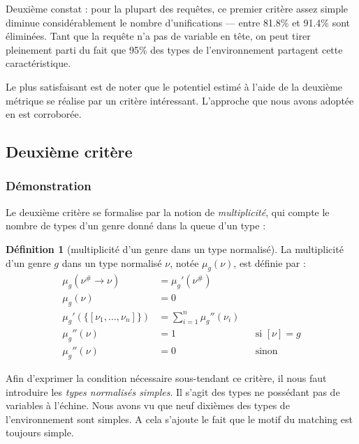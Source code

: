 \documentclass[a4paper]{report}
\theoremstyle{definition}
\newtheorem{definition}[theoreme]{Définition}
\newcommand{\mset}[1]{\{\![#1]\!\}}
\begin{document}
Deuxième constat : pour la plupart des requêtes, ce premier critère assez simple diminue considérablement le nombre d'unifications — entre 81.8\% et 91.4\% sont éliminées. Tant que la requête n'a pas de variable en tête, on peut tirer pleinement parti du fait que 95\% des types de l'environnement partagent cette caractéristique.

Le plus satisfaisant est de noter que le potentiel estimé à l'aide de la deuxième métrique se réalise par un critère intéressant. L'approche que nous avons adoptée en est corroborée.


\subsection{Deuxième critère}

\subsubsection{Démonstration}

Le deuxième critère se formalise par la notion de \emph{multiplicité}, qui compte le nombre de types d'un genre donné dans la queue d'un type :

\begin{definition}[multiplicité d'un genre dans un type normalisé]
  La multiplicité d'un genre $g$ dans un type normalisé $\nu$, notée $\mu_g (\nu)$, est définie par :
  \begin{align*}
      \mu_g (\nu^\# \rightarrow \nu) &=
      \mu_g' (\nu^\#)
    \\
      \mu_g (\nu) &=
      0
    \\
      \mu_g' (\mset{\nu_1, \dots, \nu_n}) &=
      \sum_{i=1}^n \mu_g'' (\nu_i)
    \\
      \mu_g'' (\nu) &=
      1 &&
      \text{si } [\nu] = g
    \\
      \mu_g'' (\nu) &=
      0 &&
      \text{sinon}
  \end{align*}
\end{definition}

Afin d'exprimer la condition nécessaire sous-tendant ce critère, il nous faut introduire les \emph{types normalisés simples}. Il s'agit des types ne possédant pas de variables à l'échine. Nous avons vu que neuf dixièmes des types de l'environnement sont simples. A cela s'ajoute le fait que le motif du matching est toujours simple.
\end{document}
